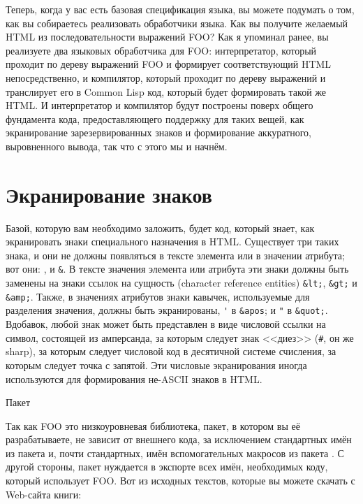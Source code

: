 Теперь, когда у вас есть базовая спецификация языка, вы можете подумать о том, как вы
собираетесь реализовать обработчики языка. Как вы получите желаемый HTML из
последовательности выражений FOO? Как я упоминал ранее, вы реализуете два языковых
обработчика для FOO: интерпретатор, который проходит по дереву выражений FOO и формирует
соответствующий HTML непосредственно, и компилятор, который проходит по дереву выражений и
транслирует его в Common Lisp код, который будет формировать такой же HTML. И
интерпретатор и компилятор будут построены поверх общего фундамента кода, предоставляющего
поддержку для таких вещей, как экранирование зарезервированных знаков и формирование
аккуратного, выровненного вывода, так что с этого мы и начнём.

\section{Экранирование знаков}

Базой, которую вам необходимо заложить, будет код, который знает, как экранировать знаки
специального назначения в HTML. Существует три таких знака, и они не должны появляться в
тексте элемента или в значении атрибута; вот они: \code{<}, \code{>} и \lstinline!&!. В
тексте значения элемента или атрибута эти знаки должны быть заменены на знаки ссылок на
сущность (character reference entities) \lstinline!&lt;!, \lstinline!&gt;! и
\lstinline!&amp;!. Также, в значениях атрибутов знаки кавычек, используемые для разделения
значения, должны быть экранированы, \lstinline!'! в \lstinline!&apos!; и \lstinline!"! в
\lstinline!&quot;!. Вдобавок, любой знак может быть представлен в виде числовой ссылки на
символ, состоящей из амперсанда, за которым следует знак <<диез>> (\lstinline!#!, он же
sharp), за которым следует числовой код в десятичной системе счисления, за которым следует
точка с запятой. Эти числовые экранирования иногда используются для формирования не-ASCII
знаков в HTML.


Пакет 

Так как FOO это низкоуровневая библиотека, пакет, в котором вы её разрабатываете, не
зависит от внешнего кода, за исключением стандартных имён из пакета  и,
почти стандартных, имён вспомогательных макросов из пакета
. С другой стороны, пакет нуждается в экспорте всех
имён, необходимых коду, который использует FOO. Вот  из исходных текстов,
которые вы можете скачать с Web-сайта книги:

